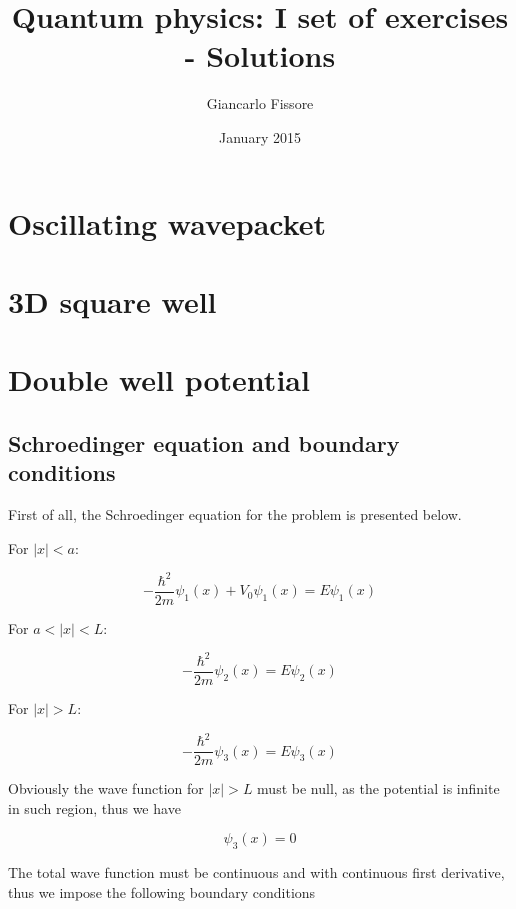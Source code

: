 \documentclass{article}
\begin{document}
\title{Quantum physics: I set of exercises - Solutions}
\author{Giancarlo Fissore}
\date{January 2015}
\maketitle

\section{Oscillating wavepacket}

\section{3D square well}

\section{Double well potential}

\subsection{Schroedinger equation and boundary conditions}
First of all, the Schroedinger equation for the problem is presented below.

For \(\left|x\right| < a\):

\begin{equation}
\label{eq:schr1}
-\frac{\hbar^2}{2m}\psi_{1}(x) + V_{0}\psi_{1}(x) = E\psi_{1}(x)
\end{equation}

For \(a < \left|x\right| < L\):

\begin{equation}
\label{eq:schr2}
-\frac{\hbar^2}{2m}\psi_{2}(x) = E\psi_{2}(x)
\end{equation}

For \(\left|x\right| > L\):

\begin{equation}
\label{eq:schr3}
-\frac{\hbar^2}{2m}\psi_{3}(x) = E\psi_{3}(x)
\end{equation}

Obviously the wave function for \(\left|x\right| > L\) must be null, as the potential is infinite in such region, thus we have

\begin{equation}
\psi_{3}(x) = 0
\end{equation}

The total wave function must be continuous and with continuous first derivative, thus we impose the following boundary conditions
\end{document}
